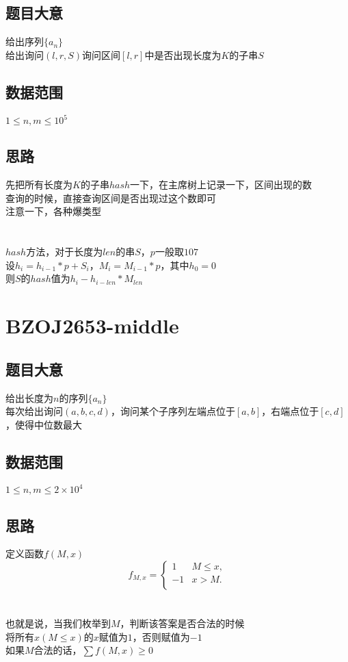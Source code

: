 \documentclass{ctexart}
\numberwithin{equation}{section}
\begin{document}
\begin{flushleft}
  \subsection{题目大意}
  给出序列$\{a_n\}$\\
  给出询问$(l,r,S)$询问区间$[l,r]$中是否出现长度为$K$的子串$S$\\
  \subsection{数据范围}
  $1\le n,m \le 10^5$
  \subsection{思路}
  先把所有长度为$K$的子串$hash$一下，在主席树上记录一下，区间出现的数\\
  查询的时候，直接查询区间是否出现过这个数即可\\
  注意一下，各种爆类型\\
  ~\\
  ~\\
  $hash$方法，对于长度为$len$的串$S$，$p$一般取$107$\\
  设$h_i=h_{i-1}*p+S_i$，$M_i = M_{i-1}*p$，其中$h_0 = 0$\\
  则$S$的$hash$值为$h_i-h_{i-len}*M_{len}$\\
  
  \newpage

  \section{BZOJ2653-middle}
  \subsection{题目大意}
  给出长度为$n$的序列$\{a_n\}$\\
  每次给出询问$(a,b,c,d)$，询问某个子序列左端点位于$[a,b]$，右端点位于$[c,d]$，使得中位数最大
  \subsection{数据范围}
  $1\le n,m \le 2\times 10^4$
  \subsection{思路}
  定义函数$f(M, x)$　\\
  \[f_{M, x}=\begin{cases}
  1 &\text{$M \le x $},\\
  -1 &\text{$x > M $}.\\
  \end{cases}\]\\
  ~\\
  也就是说，当我们枚举到$M$，判断该答案是否合法的时候\\
  将所有$x(M \le x)$的$x$赋值为$1$，否则赋值为$-1$\\
  如果$M$合法的话，$\sum f(M, x) \ge 0$\\
  ~\\


\end{flushleft}
\end{document}
